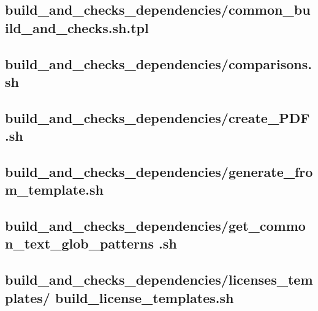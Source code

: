 \documentclass{article}
\begin{document}


\subsection{
  build\_and\_checks\_dependencies/common\_build\_and\_checks.sh.tpl
}
\label{
  build_and_checks_dependencies:common_build_and_checksshtpl
}



\subsection{
  build\_and\_checks\_dependencies/comparisons.sh
}
\label{
  build_and_checks_dependencies:comparisonssh
}



\subsection{
  build\_and\_checks\_dependencies/create\_PDF.sh
}
\label{
  build_and_checks_dependencies:create_PDFsh
}



\subsection{
  build\_and\_checks\_dependencies/generate\_from\_template.sh
}
\label{
  build_and_checks_dependencies:generate_from_templatesh
}



\subsection{
  build\_and\_checks\_dependencies/get\_common\_text\_glob\_patterns%
.sh
}
\label{
  build_and_checks_dependencies:get_common_text_glob_patternssh
}



\subsection{
  build\_and\_checks\_dependencies/licenses\_templates/%
build\_license\_templates.sh
}
\label{
  build_and_checks_dependencies:licenses_templates:%
build_license_templatessh
}
\end{document}

